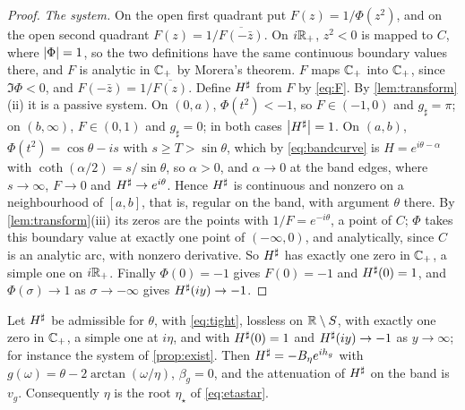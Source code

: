 \begin{proof}
\emph{The system.} On the open first quadrant put $F(z)=1/\Phi(z^2)$, and on
the open second quadrant $F(z)=1/\overline{F(-\bar z)}$. On $i\mathbb R_+$, $z^2<0$ is
mapped to $C$, where $\left|\Phi\right|=1$, so the two definitions have the same
continuous boundary values there, and $F$ is analytic in $\mathbb C_{+}$ by Morera's
theorem. $F$ maps $\mathbb C_{+}$ into $\mathbb C_{+}$, since $\Im\Phi<0$, and
$F(-\bar z)=1/\overline{F(z)}$. Define $H^{\sharp}$ from $F$ by \eqref{eq:F}. By
\cref{lem:transform}(ii) it is a passive system. On $(0,a)$, $\Phi(t^2)<-1$,
so $F\in(-1,0)$ and $g_\sharp=\pi$; on $(b,\infty)$, $F\in(0,1)$ and $g_\sharp=0$;
in both cases $\left|H^{\sharp}\right|=1$. On $(a,b)$, $\Phi(t^2)=\cos\theta-is$ with $s\ge T>\sin\theta$,
which by \eqref{eq:bandcurve} is $H=e^{i\theta-\alpha}$ with
$\coth(\alpha/2)=s/\sin\theta$, so $\alpha>0$, and $\alpha\to0$ at the band edges, where
$s\to\infty$, $F\to0$ and $H^{\sharp}\to e^{i\theta}$. Hence $H^{\sharp}$ is continuous and
nonzero on a neighbourhood of $[a,b]$, that is, regular on the band, with
argument $\theta$ there. By \cref{lem:transform}(iii) its zeros are the
points with $1/F=e^{-i\theta}$, a point of $C$; $\Phi$ takes this boundary value
at exactly one point of $(-\infty,0)$, and analytically, since $C$ is an
analytic arc, with nonzero derivative. So $H^{\sharp}$ has exactly one zero in
$\mathbb C_{+}$, a simple one on $i\mathbb R_+$. Finally $\Phi(0)=-1$ gives $F(0)=-1$ and
$H^{\sharp}(0)=1$, and $\Phi(\sigma)\to1$ as $\sigma\to-\infty$ gives $H^{\sharp}(iy)\to-1$.
\end{proof}

\begin{lemma}\label{lem:identify}
Let $H^{\sharp}$ be admissible for $\theta$, with \eqref{eq:tight}, lossless on
$\mathbb R\setminus S$, with exactly one zero in $\mathbb C_{+}$, a simple one at $i\eta$, and
with $H^{\sharp}(0)=1$ and $H^{\sharp}(iy)\to-1$ as $y\to\infty$; for instance the system of
\cref{prop:exist}. Then
$H^{\sharp}=-B_\eta e^{ih_g}$ with $g(\omega)=\theta-2\arctan(\omega/\eta)$, $\beta_g=0$, and
the attenuation of $H^{\sharp}$ on the band is $v_g$. Consequently $\eta$ is the
root $\eta_\star$ of \eqref{eq:etastar}.
\end{lemma}

